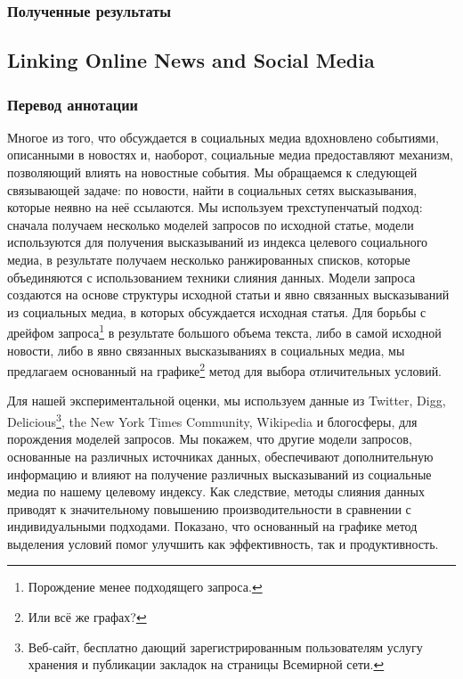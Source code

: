 \documentclass[12pt,a4paper,oneside]{extarticle}
\begin{document}
        \subsubsection{Полученные результаты}

    \subsection{Linking Online News and Social Media}
        \subsubsection{Перевод аннотации}
            Многое из того, что обсуждается в социальных медиа вдохновлено событиями, описанными в новостях и, наоборот, социальные медиа предоставляют механизм, позволяющий влиять на новостные события.
            Мы обращаемся к следующей связывающей задаче: по новости, найти в социальных сетях высказывания, которые неявно на неё ссылаются.
            Мы используем трехступенчатый подход: сначала получаем несколько моделей запросов по исходной статье, модели используются для получения высказываний из индекса целевого социального медиа, в результате получаем несколько ранжированных списков, которые объединяются с использованием техники слияния данных.
            Модели запроса создаются на основе структуры исходной статьи и явно связанных высказываний из социальных медиа, в которых обсуждается исходная статья.
            Для борьбы с дрейфом запроса\footnote{Порождение менее подходящего запроса.} в результате большого объема текста, либо в самой исходной новости, либо в явно связанных высказываниях в социальных медиа, мы предлагаем основанный на графике\footnote{Или всё же графах?} метод для выбора отличительных условий.

            Для нашей экспериментальной оценки, мы используем данные из Twitter, Digg, Delicious\footnote{Веб-сайт, бесплатно дающий зарегистрированным пользователям услугу хранения и публикации закладок на страницы Всемирной сети.}, the New York Times Community, Wikipedia и блогосферы, для порождения моделей запросов.
            Мы покажем, что другие модели запросов, основанные на различных источниках данных, обеспечивают дополнительную информацию и влияют на получение различных высказываний из социальные медиа по нашему целевому индексу.
            Как следствие, методы слияния данных приводят к значительному повышению производительности в сравнении с индивидуальными подходами.
            Показано, что основанный на графике метод выделения условий помог улучшить как эффективность, так и продуктивность.
        
\end{document}
